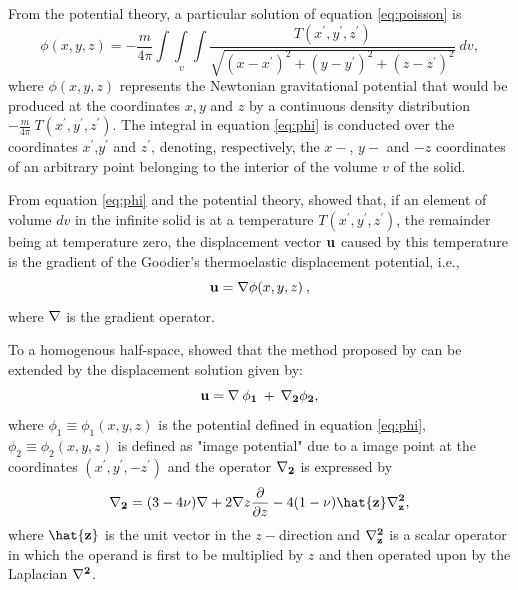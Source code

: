 \documentclass[journal abbreviation, manuscript]{copernicus}
\begin{document}
From the potential theory, a particular solution of equation \ref{eq:poisson} is
\begin{equation}
\phi(x,y,z) = -  \frac{m}{4 \pi} \int\int\limits_{v}\int \frac{T(x^{\prime}, y^{\prime}, z^{\prime} )}{\sqrt{(x - x^{\prime})^{2} + (y - y^{\prime})^{2} + (z - z^{\prime})^{2}}} \: dv,
\label{eq:phi}
\end{equation}
where $\phi(x,y,z)$ represents the Newtonian gravitational potential \citep{Kellogg29} that would be produced at the coordinates $x, y$ and $z$ by a continuous density distribution $- \frac{m}{4 \pi}  \: T( x^{\prime}, y^{\prime}, z^{\prime} )$. 
The integral in equation \ref{eq:phi} is conducted over the coordinates $x^{\prime}$,$y^{\prime}$ and $z^{\prime}$, denoting, respectively, the $x-$, $y-$ and $-z$ coordinates of an arbitrary point belonging to the interior of the volume $v$ of the solid. 


From equation \ref{eq:phi} and the potential theory, \citet{Goodier37} showed that, if an element of volume $dv$ in the infinite solid is at a temperature $T(x^{\prime}, y^{\prime}, z^{\prime}) $, the remainder being at temperature zero, the displacement vector $\bf{u}$ caused by this temperature is the gradient of the Goodier’s thermoelastic displacement potential, i.e.,
\begin{equation}
{\bf{u}} = {\bf {\nabla}} \phi(x,y,z) \: ,
\label{eq:displacement-general}
\end{equation}
where $\bf{\nabla}$ is the gradient operator.  

To a homogenous half-space, \citet{Mindlin&Cheng50} showed that the method proposed by  \citet{Goodier37} can be extended by the displacement solution given by:
\begin{equation}
\bf{u} = {\bf{\nabla}} \: \phi_{1} \: + \: {\bf{{\nabla}_{2}}} \phi_{2}, 
\label{eq:displacement-solution}
\end{equation}
where $\phi_{1} \equiv \phi_{1}(x,y,z)$ is the potential defined in equation \ref{eq:phi}, 
$\phi_{2} \equiv  \phi_{2}(x,y,z)$
is defined as "image potential" \citep{Segall92} due to a image point at the coordinates
$(x^{\prime}, y^{\prime}, -z^{\prime} )$ and the operator $\bf{{\nabla}_{2}}$ is expressed by
\begin{equation}
{\bf{{\nabla}_{2}}} = (3 - 4\nu){\bf{\nabla}} + 2 {\bf{\nabla}} z \frac{\partial }{\partial z}  - 4(1- \nu){\bf{\hat{z}}} {\bf{{\nabla}^{2}_{z}}},
\label{eq:nabla2}
\end{equation}
where ${\bf{\hat{z}}}$ is the unit vector in the $z-$direction and 
${\bf{{\nabla}^{2}_{z}}}$ is a scalar operator in which the operand is first to be  multiplied by $z$ and then operated upon by the Laplacian ${\bf{\nabla}^{2}}$. 
\end{document}
